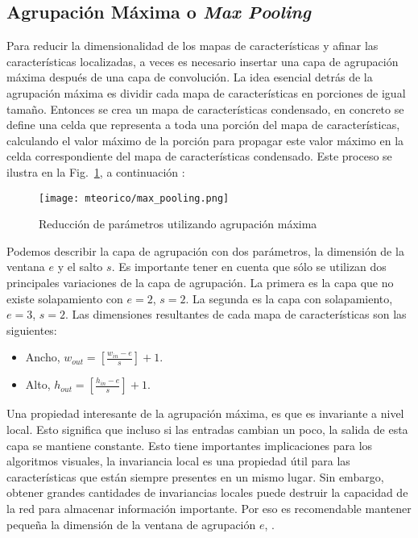    \subsection{Agrupación Máxima o \textit{Max Pooling}}

    Para reducir la dimensionalidad de los mapas de características y afinar las características localizadas, a veces es necesario insertar una capa de agrupación máxima después de una capa de convolución. La idea esencial detrás de la agrupación máxima es dividir cada mapa de características en porciones de igual tamaño. Entonces se crea un mapa de características condensado, en concreto se define una celda que representa a toda una porción del mapa de características, calculando el valor máximo de la porción para propagar este valor máximo en la celda correspondiente del mapa de características condensado. Este proceso se ilustra en la Fig.~\ref{fig:max_pooling}, a continuación \cite{dlBook}:
	\begin{figure}[htp]
        \centering
        \texttt{[image: mteorico/max\_pooling.png]}
        \caption{Reducción de parámetros utilizando agrupación máxima}
        \label{fig:max_pooling}
    \end{figure}

    Podemos describir la capa de agrupación con dos parámetros, la dimensión de la ventana $e$ y el salto $s$. Es importante tener en cuenta que sólo se utilizan dos principales variaciones de la capa de agrupación. La primera es la capa que no existe solapamiento con $e=2$, $s=2$. La segunda es la capa con solapamiento, $e=3$, $s=2$. Las dimensiones resultantes de cada mapa de características son las siguientes:

    \begin{itemize}
		\item Ancho, $w_{out}=\left[\frac{w_{in}-e}{s}\right]+1$.
		\item Alto, $h_{out}=\left[\frac{h_{in}-e}{s}\right]+1$.
	\end{itemize}
	
	Una propiedad interesante de la agrupación máxima, es que es invariante a nivel local. Esto significa que incluso si las entradas cambian un poco, la salida de esta capa se mantiene constante. Esto tiene importantes implicaciones para los algoritmos visuales, la invariancia local es una propiedad útil para las características que están siempre presentes en un mismo lugar. Sin embargo, obtener grandes cantidades de invariancias locales puede destruir la capacidad de la red para almacenar información importante. Por eso es recomendable mantener pequeña la dimensión de la ventana de agrupación $e$, \cite{dlBook}.
	

